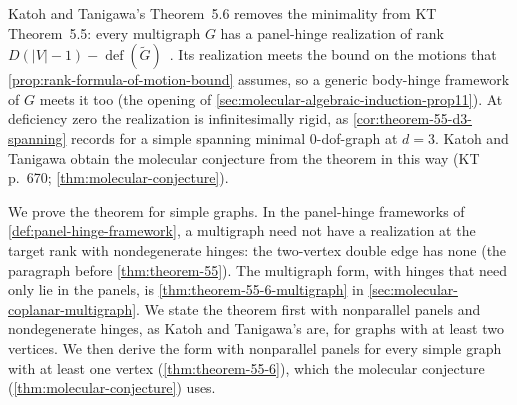 Katoh and Tanigawa's Theorem~5.6 removes the minimality from KT
Theorem~5.5: every multigraph $G$ has a panel-hinge realization of rank
$D(|V| - 1) - \operatorname{def}(\tilde G)$~\cite[p.~670]{katohTanigawa2011}.
Its realization meets the bound on the motions that
\cref{prop:rank-formula-of-motion-bound} assumes, so a generic body-hinge
framework of $G$ meets it too (the opening of
\cref{sec:molecular-algebraic-induction-prop11}).
At deficiency zero the realization is infinitesimally rigid, as
\cref{cor:theorem-55-d3-spanning} records for a simple spanning minimal
$0$-dof-graph at $d = 3$. Katoh and Tanigawa obtain the molecular conjecture from the
theorem in this way (KT p.~670; \cref{thm:molecular-conjecture}).

We prove the theorem for simple graphs. In the panel-hinge frameworks of
\cref{def:panel-hinge-framework}, a multigraph need not have a realization
at the target rank with nondegenerate hinges: the two-vertex double edge
has none (the paragraph before \cref{thm:theorem-55}). The multigraph form,
with hinges that need only lie in the panels, is
\cref{thm:theorem-55-6-multigraph} in
\cref{sec:molecular-coplanar-multigraph}. We state the theorem first with
nonparallel panels and nondegenerate hinges, as Katoh and Tanigawa's are,
for graphs with at least two vertices. We then derive the form with
nonparallel panels for every simple graph with at least one vertex
(\cref{thm:theorem-55-6}), which the molecular conjecture
(\cref{thm:molecular-conjecture}) uses.

